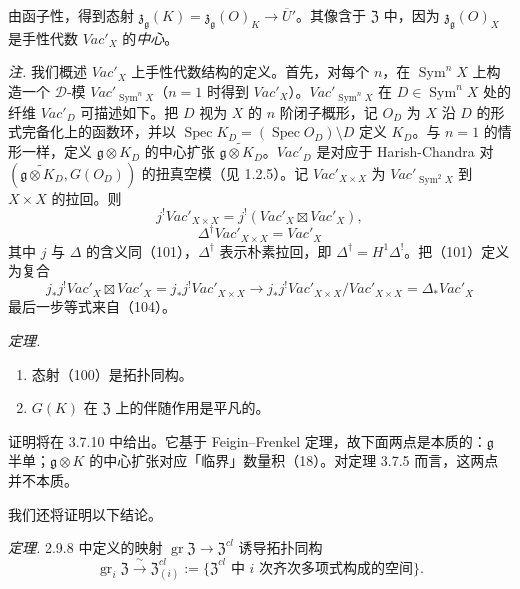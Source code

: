 由函子性，得到态射 $\mathfrak{z}_{\mathfrak{g}}(K)=\mathfrak{z}_{\mathfrak{g}}(O)_K\to\overline{U}'$。其像含于 $\mathfrak{Z}$ 中，因为 $\mathfrak{z}_{\mathfrak{g}}(O)_X$ 是手性代数 $\mathit{Vac}'_X$ 的\emph{中心}。

\emph{注.} 我们概述 $\mathit{Vac}'_X$ 上手性代数结构的定义。首先，对每个 $n$，在 $\operatorname{Sym}^nX$ 上构造一个 $\mathcal{D}$-模 $\mathit{Vac}'_{\operatorname{Sym}^nX}$（$n=1$ 时得到 $\mathit{Vac}'_X$）。$\mathit{Vac}'_{\operatorname{Sym}^nX}$ 在 $D\in\operatorname{Sym}^nX$ 处的纤维 $\mathit{Vac}'_D$ 可描述如下。把 $D$ 视为 $X$ 的 $n$ 阶闭子概形，记 $O_D$ 为 $X$ 沿 $D$ 的形式完备化上的函数环，并以 $\operatorname{Spec}K_D=(\operatorname{Spec}O_D)\setminus D$ 定义 $K_D$。与 $n=1$ 的情形一样，定义 $\mathfrak{g}\otimes K_D$ 的中心扩张 $\widetilde{\mathfrak{g}\otimes K_D}$。$\mathit{Vac}'_D$ 是对应于 Harish-Chandra 对 $(\widetilde{\mathfrak{g}\otimes K_D},G(O_D))$ 的扭真空模（见 1.2.5）。记 $\mathit{Vac}'_{X\times X}$ 为 $\mathit{Vac}'_{\operatorname{Sym}^2X}$ 到 $X\times X$ 的拉回。则
\begin{equation}\tag{103}
j^{!}\mathit{Vac}'_{X\times X}=j^{!}(\mathit{Vac}'_X\boxtimes\mathit{Vac}'_X),
\end{equation}
\begin{equation}\tag{104}
\Delta^{\dagger}\mathit{Vac}'_{X\times X}=\mathit{Vac}'_X
\end{equation}
其中 $j$ 与 $\Delta$ 的含义同（101），$\Delta^{\dagger}$ 表示朴素拉回，即 $\Delta^{\dagger}=H^1\Delta^{!}$。把（101）定义为复合
\[
j_*j^{!}\mathit{Vac}'_X\boxtimes\mathit{Vac}'_X=j_*j^{!}\mathit{Vac}'_{X\times X}\to j_*j^{!}\mathit{Vac}'_{X\times X}/\mathit{Vac}'_{X\times X}=\Delta_*\mathit{Vac}'_X
\]
最后一步等式来自（104）。

 \emph{定理.}
\begin{enumerate}[label=(\roman*),leftmargin=2.2em]
\item 态射（100）是拓扑同构。
\item $G(K)$ 在 $\mathfrak{Z}$ 上的伴随作用是平凡的。
\end{enumerate}
证明将在 3.7.10 中给出。它基于 Feigin--Frenkel 定理，故下面两点是本质的：$\mathfrak{g}$ 半单；$\mathfrak{g}\otimes K$ 的中心扩张对应「临界」数量积（18）。对定理 3.7.5 而言，这两点并不本质。

我们还将证明以下结论。

 \emph{定理.} 2.9.8 中定义的映射 $\operatorname{gr}\mathfrak{Z}\to\mathfrak{Z}^{cl}$ 诱导拓扑同构
\[
\operatorname{gr}_i\mathfrak{Z}\xrightarrow{\ \sim\ }\mathfrak{Z}^{cl}_{(i)}:=\{\mathfrak{Z}^{cl}\text{ 中 }i\text{ 次齐次多项式构成的空间}\}.
\]

